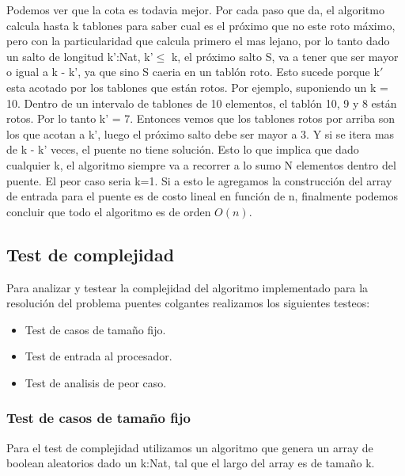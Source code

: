 \label{an}
Podemos ver que la cota es todavia mejor.
Por cada paso que da, el algoritmo calcula hasta k tablones para saber cual es el pr\'oximo que no este roto m\'aximo, pero con la particularidad que calcula primero el mas lejano, por lo tanto dado un salto de longitud k':Nat, k'$\leq$ k, el pr\'oximo salto S, va a tener que ser mayor o igual a k - k', ya que sino S caeria en un tabl\'on roto.
Esto sucede porque k$'$ esta acotado por los tablones que est\'an rotos.
Por ejemplo, suponiendo un k = 10. Dentro de un intervalo de tablones de 10 elementos, el tabl\'on 10, 9 y 8 est\'an rotos. Por lo tanto k' = 7. Entonces vemos que los tablones rotos por arriba son los que acotan a k', luego el pr\'oximo salto debe ser mayor a 3. Y si se itera mas de k - k' veces, el puente no tiene soluci\'on.
Esto lo que implica que dado cualquier k, el algoritmo siempre va a recorrer a lo sumo N elementos dentro del puente. El peor caso seria k=1.
Si a esto le agregamos la construcci\'on del array de entrada para el puente es de costo lineal en funci\'on de n, finalmente podemos concluir que todo el algoritmo es de orden $O(n)$.

\subsection{Test de complejidad}

Para analizar y testear la complejidad del algoritmo implementado para la resoluci\'on del problema puentes colgantes realizamos los siguientes testeos:

\begin{itemize}
  \item Test de casos de tamaño fijo.
  \item Test de entrada al procesador.
  \item Test de analisis de peor caso.
\end{itemize}

\newpage



\subsubsection{Test de casos de tamaño fijo}


Para el test de complejidad utilizamos un algoritmo que genera un array de boolean aleatorios dado un k:Nat, tal que el largo del array es de tamaño k.

